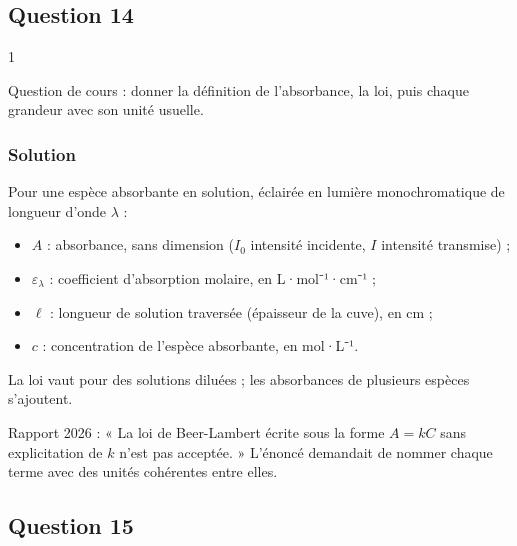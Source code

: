 \documentclass[11pt,a4paper]{article}
\providecommand{\tightlist}{\setlength{\itemsep}{0pt}\setlength{\parskip}{0pt}}
\newcommand{\equationajustee}[1]{%
  \sbox{\boiteequation}{$\displaystyle #1$}%
  \ifdim\wd\boiteequation>\linewidth
    \[\resizebox{\linewidth}{!}{\usebox{\boiteequation}}\]%
  \else
    \[#1\]%
  \fi}
\begin{document}
\hypertarget{question-14}{%
\subsection{Question 14}\label{question-14}}

\begin{indication}{1}

Question de cours : donner la définition de l'absorbance, la loi, puis chaque grandeur avec son unité usuelle.

\end{indication}

\hypertarget{solution-13}{%
\subsubsection{Solution}\label{solution-13}}

Pour une espèce absorbante en solution, éclairée en lumière monochromatique de longueur d'onde \(\lambda\) :

\equationajustee{\boxed{A=\log\frac{I_0}{I}=\varepsilon_\lambda\,\ell\,c}}

\begin{itemize}
\tightlist
\item
  \(A\) : absorbance, sans dimension (\(I_0\) intensité incidente, \(I\) intensité transmise) ;
\item
  \(\varepsilon_\lambda\) : coefficient d'absorption molaire, en L·mol⁻¹·cm⁻¹ ;
\item
  \(\ell\) : longueur de solution traversée (épaisseur de la cuve), en cm ;
\item
  \(c\) : concentration de l'espèce absorbante, en mol·L⁻¹.
\end{itemize}

La loi vaut pour des solutions diluées ; les absorbances de plusieurs espèces s'ajoutent.

\begin{jury}

Rapport 2026 : « La loi de Beer-Lambert écrite sous la forme \(A = kC\) sans explicitation de \(k\) n'est pas acceptée. » L'énoncé demandait de nommer chaque terme avec des unités cohérentes entre elles.

\end{jury}

\hypertarget{question-15}{%
\subsection{Question 15}\label{question-15}}
\end{document}
